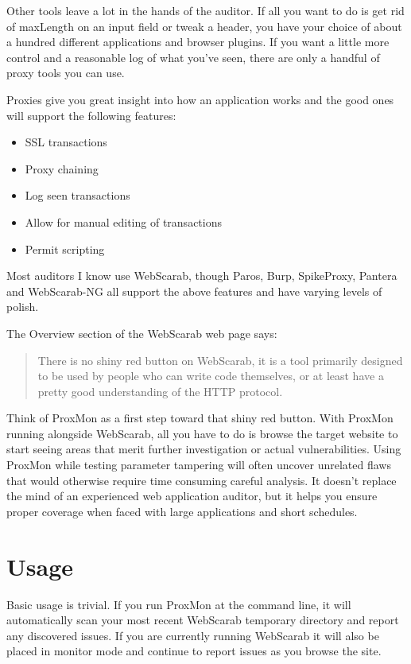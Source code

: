 \documentclass{article}
\newenvironment{minitem}{\begin{itemize}\parsep = -0.1in \itemsep = -0.1in}{\end{itemize}}
\begin{document}
Other tools leave a lot in the hands of the auditor.  If all you want to do is
get rid of maxLength on an input field or tweak a header, you have your choice of about
a hundred different applications and browser plugins.  If you want a little more
control and a reasonable log of what you've seen, there are only a handful of proxy tools
you can use.

Proxies give you great insight into how an application works and the good ones
will support the following features:
\begin{minitem}
\item SSL transactions
\item Proxy chaining
\item Log seen transactions
\item Allow for manual editing of transactions
\item Permit scripting
\end{minitem}

Most auditors I know use WebScarab, though Paros, Burp, SpikeProxy, Pantera and
WebScarab-NG all support the above features and have varying levels of polish.

The Overview section of the WebScarab web page says:
\begin{quote}
There is no shiny red button on WebScarab, it is a tool primarily designed to be used 
by people who can write code themselves, or at least have a pretty good understanding 
of the HTTP protocol.
\end{quote}
Think of ProxMon as a first step toward that shiny red button.  With ProxMon running 
alongside 
WebScarab, all you have to do is browse the target website to start seeing areas
that merit further investigation or actual vulnerabilities.  Using ProxMon while
testing parameter tampering will often uncover unrelated flaws that would otherwise
require time consuming careful analysis.  It doesn't replace the mind of an experienced
web application auditor, but it helps you ensure proper coverage when faced with large
applications and short schedules.

\section{Usage}
Basic usage is trivial.  If you run ProxMon at the command line, it will automatically scan
your most recent WebScarab temporary directory and report any discovered issues.  If you
are currently running WebScarab it will also be placed in monitor mode and continue to
report issues as you browse the site.
\end{document}
